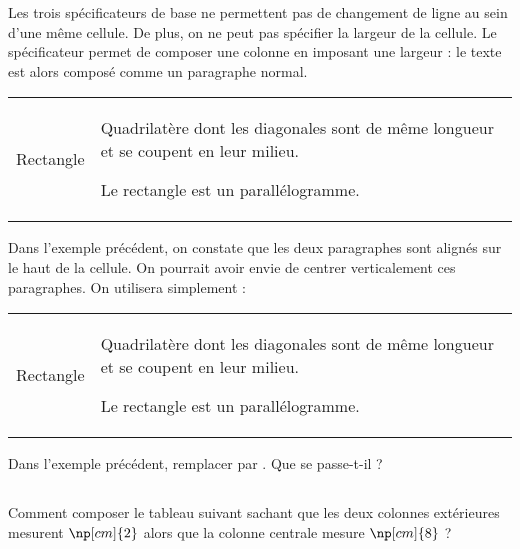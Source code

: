 \documentclass[10pt,french,openright,twoside]{book}
\begin{document}
Les trois spécificateurs de base ne permettent pas de changement de ligne au sein d'une même cellule. De plus, on ne peut pas spécifier la largeur de la cellule. Le spécificateur  permet de composer une colonne en imposant une largeur : le texte est alors composé comme un paragraphe normal. \bigskip

{\NewFont
\begin{SideBySideExample}
    \begin{tabular}{r|p{4.5cm}}
        Rectangle & Quadrilat\`ere dont les diagonales
        sont de m\^eme longueur et
        se coupent en leur milieu.\par
        Le rectangle est un parall\'elogramme.
    \end{tabular}
\end{SideBySideExample}
}\bigskip

Dans l'exemple précédent, on constate que les deux paragraphes sont alignés sur le haut de la cellule. On pourrait avoir envie de centrer verticalement ces paragraphes. On utilisera simplement  :\bigskip

{\NewFont
\begin{SideBySideExample}
    \begin{tabular}{r|m{4.5cm}}
        Rectangle & Quadrilat\`ere dont les diagonales
        sont de m\^eme longueur et
        se coupent en leur milieu.\par
        Le rectangle est un parall\'elogramme.
    \end{tabular}
\end{SideBySideExample}
}\bigskip

\begin{info}
    Dans l'exemple précédent, remplacer  par . Que se passe-t-il ?
\end{info}

\subsection*{\ExoFiche}
Comment composer le tableau suivant  sachant que les deux colonnes extérieures mesurent $\np[cm]{2}$ alors que la colonne centrale mesure $\np[cm]{8}$ ?\bigskip
\end{document}
